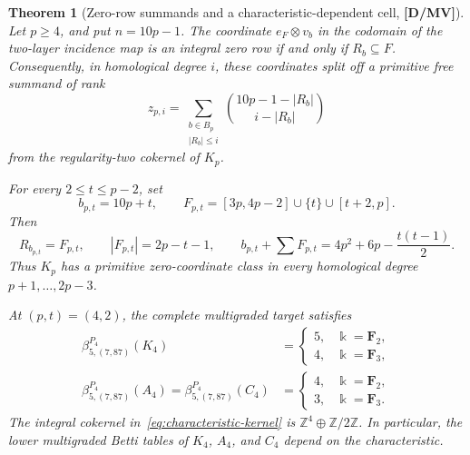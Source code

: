 \documentclass[11pt]{article}
\newtheorem{theorem}{Theorem}[section]
\theoremstyle{definition}
\theoremstyle{remark}
\newcommand{\kfield}{\Bbbk}
\begin{document}
\begin{theorem}[Zero-row summands and a characteristic-dependent cell, {\bf[D/MV]}]
\label{thm:zero-row-characteristic}
Let $p\ge4$, and put $n=10p-1$. The coordinate
$e_F\otimes v_b$ in the codomain of the two-layer incidence map is an integral zero row if and
only if $R_b\subseteq F$. Consequently, in homological degree $i$, these coordinates split off
a primitive free summand of rank
\begin{equation}
z_{p,i}=\sum_{\substack{b\in B_p\\|R_b|\le i}}
\binom{10p-1-|R_b|}{i-|R_b|}
\label{eq:zero-row-rank}
\end{equation}
from the regularity-two cokernel of $K_p$.

For every $2\le t\le p-2$, set
\begin{equation}
b_{p,t}=10p+t,\qquad
F_{p,t}=[3p,4p-2]\cup\{t\}\cup[t+2,p].
\label{eq:zero-row-family}
\end{equation}
Then
\begin{equation}
R_{b_{p,t}}=F_{p,t},\qquad
|F_{p,t}|=2p-t-1,\qquad
b_{p,t}+\sum F_{p,t}=4p^2+6p-\frac{t(t-1)}2.
\label{eq:zero-row-family-data}
\end{equation}
Thus $K_p$ has a primitive zero-coordinate class in every homological degree
$p+1,\ldots,2p-3$.

At $(p,t)=(4,2)$, the complete multigraded target satisfies
\begin{align}
\beta_{5,(7,87)}^{P_4}(K_4)&=
\begin{cases}5,&\kfield=\mathbf F_2,\\4,&\kfield=\mathbf F_3,\end{cases}
\label{eq:characteristic-kernel}\\
\beta_{5,(7,87)}^{P_4}(A_4)
=\beta_{5,(7,87)}^{P_4}(C_4)&=
\begin{cases}4,&\kfield=\mathbf F_2,\\3,&\kfield=\mathbf F_3.\end{cases}
\label{eq:characteristic-quotients}
\end{align}
The integral cokernel in~\eqref{eq:characteristic-kernel} is
$\mathbb Z^4\oplus\mathbb Z/2\mathbb Z$. In particular, the lower multigraded Betti tables of
$K_4$, $A_4$, and $C_4$ depend on the characteristic.
\end{theorem}
\end{document}
